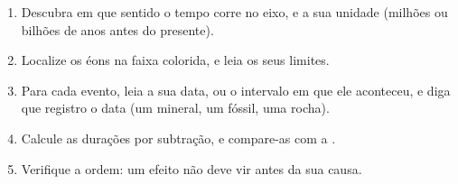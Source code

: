 \begin{method}\label{met:g12:early-earth:timeline}
\begin{enumerate}
  \item Descubra em que sentido o tempo corre no eixo, e a sua unidade
        (milhões ou bilhões de anos antes do presente).
  \item Localize os éons na faixa colorida, e leia os seus limites.
  \item Para cada evento, leia a sua data, ou o intervalo em que ele
        aconteceu, e diga que registro o data (um mineral, um fóssil, uma rocha).
  \item Calcule as durações por subtração, e compare-as com a .
  \item Verifique a ordem: um efeito não deve vir antes da sua causa.
\end{enumerate}
\end{method}

